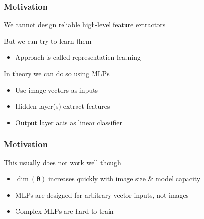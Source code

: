 \documentclass[xetex,professionalfont]{beamer}
\renewcommand\emph[1]{\textcolor{tuwcvl_cvl_blue}{#1}}
\newcommand{\bth}{\boldsymbol{\theta}}
\begin{document}
\begin{frame}
\frametitle{Motivation}

We cannot design reliable high-level feature extractors

\bigskip

But we can try to learn them
\begin{itemize}
    \item Approach is called \emph{representation learning}
\end{itemize}

\bigskip

In theory we can do so using MLPs %
\begin{itemize}
    \item Use image vectors as inputs
    \item Hidden layer(s) extract features
    \item Output layer acts as linear classifier
\end{itemize}

\end{frame}


\begin{frame}
\frametitle{Motivation}

This usually does not work well though %
\begin{itemize}
    \item $\dim(\bth)$ increases quickly with image size \& model capacity
    \item MLPs are designed for arbitrary vector inputs, not images
    \item Complex MLPs are hard to train %
\end{itemize}

\smallskip

\begin{center}
\end{center}

\end{frame}
\end{document}
